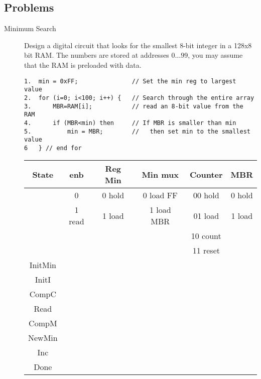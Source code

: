 \subsection{Problems}
\begin{description}


\item[Minimum Search]

Design a digital circuit that looks for the smallest 
8-bit integer in a 128x8 bit RAM.  The numbers
are stored at addresses $0\ldots 99$, you may assume that the 
RAM is preloaded with data.

\begin{verbatim}
1.  min = 0xFF;               // Set the min reg to largest value
2.  for (i=0; i<100; i++) {   // Search through the entire array
3.      MBR=RAM[i];           // read an 8-bit value from the RAM
4.      if (MBR<min) then     // If MBR is smaller than min
5.          min = MBR;        //   then set min to the smallest value
6   } // end for
\end{verbatim}




\begin{tabular}{c||c|c|c|c|c}  
State   & enb       &  Reg Min  & Min mux       & Counter & MBR	\\ \hline
        & 0     &  0 hold   & 0 load FF     & 00 hold & 0 hold	\\ \hline
        & 1 read  &  1 load   & 1 load MBR    & 01 load & 1 load	\\ \hline
        &                 &           &               & 10 count& 		\\ \hline
        &                &           &               & 11 reset& \\ \hline \hline
InitMin &            &          &              &       &    \\ \hline
InitI   &              &          &              &       &    \\ \hline
CompC   &             &          &              &       &    \\ \hline
Read    &             &          &              &       &    \\ \hline
CompM   &           &          &              &       &    \\ \hline
NewMin  &             &          &              &       &    \\ \hline
Inc     &             &          &              &       &    \\ \hline
Done    &             &          &              &       &    \\ 
\end{tabular}


\end{description}
